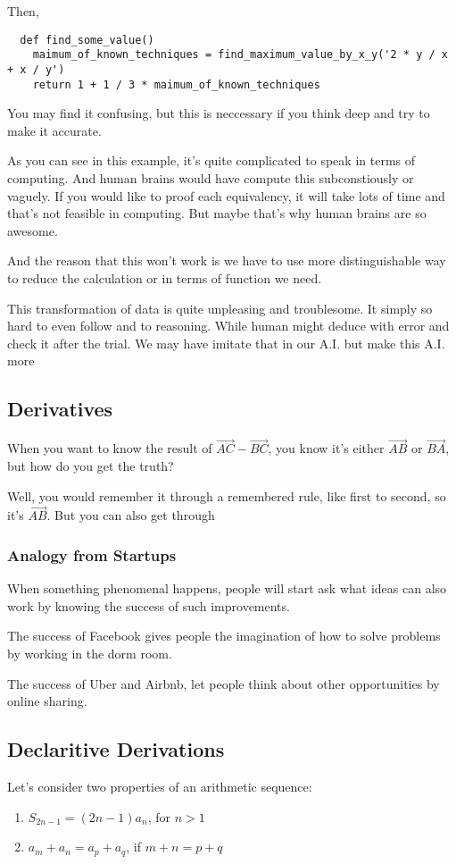Then,

\begin{verbatim}
  def find_some_value()
    maimum_of_known_techniques = find_maximum_value_by_x_y('2 * y / x + x / y')
    return 1 + 1 / 3 * maimum_of_known_techniques
\end{verbatim}

You may find it confusing, but this is neccessary if you think deep and try to make it accurate.

As you can see in this example, it's quite complicated to speak in terms of computing. And human brains would have compute this subconstiously or vaguely. If you would like to proof each equivalency, it will take lots of time and that's not feasible in computing. But maybe that's why human brains are so awesome.

And the reason that this won't work is we have to use more distinguishable way to reduce the calculation or in terms of function we need.

This transformation of data is quite unpleasing and troublesome. It simply so hard to even follow and to reasoning. While human might deduce with error and check it after the trial. We may have imitate that in our A.I. but make this A.I. more

\subsection{Derivatives}

When you want to know the result of $\overrightarrow{AC} - \overrightarrow{BC} $, you know it's either $\overrightarrow{AB}$ or $\overrightarrow{BA}$, but how do you get the truth?

Well, you would remember it through a remembered rule, like first to second, so it's $\overrightarrow{AB}$. But you can also get through

\subsubsection*{Analogy from Startups}
When something phenomenal happens, people will start ask what ideas can also work by knowing the success of such improvements.

The success of Facebook gives people the imagination of how to solve problems by working in the dorm room.

The success of Uber and Airbnb, let people think about other opportunities by online sharing.

\subsection{Declaritive Derivations}
Let's consider two properties of an arithmetic sequence:
\begin{enumerate}
  \item $S_{2n-1} = (2n-1) a_n$, for $n > 1$
  \item $a_m + a_n = a_p + a_q$, if $m +n = p + q$
\end{enumerate}

